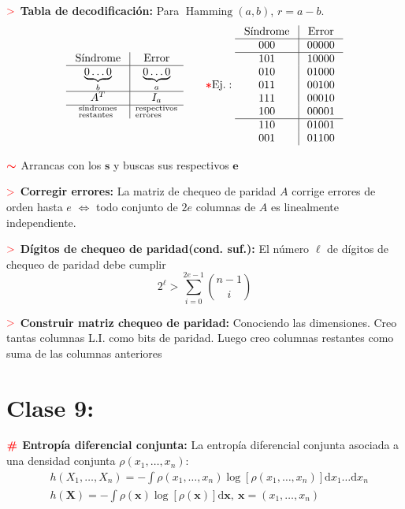 \documentclass[%
 reprint,
 amsmath,amssymb,
 aps,
]{revtex4-1}
\begin{document}
\textbf{$\textcolor{red}{\mathbf{>}}$ Tabla de decodificación:} Para $\operatorname{Hamming}(a,b)$, $r=a-b$.
$$
\begin{array}{c|c}
\text { Síndrome } & \text { Error } \\
\hline \underbrace{0\ldots0}_b & \underbrace{0\ldots0}_a \\
\hline A^T & I_a \\
\hline ^\text{síndromes}_\text{restantes} & ^\text{respectivos}_\text{errores} \\
\end{array}
\qquad \textcolor{red}{\color{red}{\boldsymbol{*}}} \text{Ej.}: 
\begin{array}{c|c}
\text { Síndrome } & \text { Error } \\
\hline 000 & 00000 \\
\hline 101 & 10000 \\
010 & 01000 \\
011 & 00100 \\
111 & 00010 \\
100 & 00001 \\
\hline 110 & 01001 \\
001 & 01100
\end{array}
$$

\textbf{$\textcolor{red}{\color{red}{\boldsymbol{\sim}}}$ } Arrancas con los $\mathbf{s}$ y buscas sus respectivos $\mathbf{e}$

\textbf{$\textcolor{red}{\mathbf{>}}$ Corregir errores:} La matriz de chequeo de paridad $A$ corrige errores de orden hasta $e$ $\Leftrightarrow$ todo conjunto de $2e$ columnas de $A$ es linealmente independiente.

\textbf{$\textcolor{red}{\mathbf{>}}$ Dígitos de chequeo de paridad(cond. suf.):} El número $\ell$ de dígitos de chequeo de paridad debe cumplir
$$
2^{\ell}>\sum_{i=0}^{2 e-1} {n-1 \choose i}
$$

\textbf{$\textcolor{red}{\mathbf{>}}$ Construir matriz chequeo de paridad:} 
Conociendo las dimensiones. Creo tantas columnas L.I. como bits de paridad. Luego creo columnas restantes como suma de las columnas anteriores 

\section{Clase 9:}

\textbf{$\color{red}{\textbf{\#}}$ Entropía diferencial conjunta:} 
La entropía diferencial conjunta asociada a una densidad conjunta $\rho\left(x_{1}, \ldots, x_{n}\right)$:
$$
\begin{aligned}
  &h\left(X_{1}, \ldots, X_{n}\right)=-\int \rho\left(x_{1}, \ldots, x_{n}\right) \log \left[\rho\left(x_{1}, \ldots, x_{n}\right)\right] \mathrm{d} x_{1} \ldots \mathrm{d} x_{n} \\
  &h(\boldsymbol{X})=-\int \rho(\boldsymbol{x}) \log [\rho(\boldsymbol{x})] \mathrm{d} \boldsymbol{x}
, \ \boldsymbol{x}=\left(x_{1}, \ldots, x_{n}\right)
\end{aligned}
$$
\end{document}
